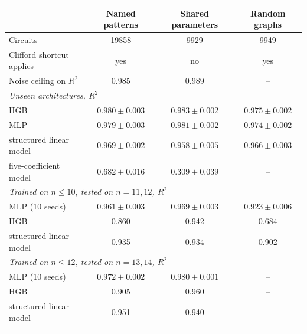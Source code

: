 \begin{tabular}{lccc}
\toprule
 & Named patterns & Shared parameters & Random graphs \\
\midrule
Circuits & 19858 & 9929 & 9949 \\
Clifford shortcut applies & yes & no & yes \\
Noise ceiling on $R^2$ & 0.985 & 0.989 & -- \\
\midrule
\multicolumn{4}{l}{\emph{Unseen architectures, $R^2$}}\\
\quad HGB & $0.980 \pm 0.003$ & $0.983 \pm 0.002$ & $0.975 \pm 0.002$ \\
\quad MLP & $0.979 \pm 0.003$ & $0.981 \pm 0.002$ & $0.974 \pm 0.002$ \\
\quad structured linear model & $0.969 \pm 0.002$ & $0.958 \pm 0.005$ & $0.966 \pm 0.003$ \\
\quad five-coefficient model & $0.682 \pm 0.016$ & $0.309 \pm 0.039$ & -- \\
\midrule
\multicolumn{4}{l}{\emph{Trained on $n\le10$, tested on $n=11,12$, $R^2$}}\\
\quad MLP (10 seeds) & $0.961 \pm 0.003$ & $0.969 \pm 0.003$ & $0.923 \pm 0.006$ \\
\quad HGB & 0.860 & 0.942 & 0.684 \\
\quad structured linear model & 0.935 & 0.934 & 0.902 \\
\midrule
\multicolumn{4}{l}{\emph{Trained on $n\le12$, tested on $n=13,14$, $R^2$}}\\
\quad MLP (10 seeds) & $0.972 \pm 0.002$ & $0.980 \pm 0.001$ & -- \\
\quad HGB & 0.905 & 0.960 & -- \\
\quad structured linear model & 0.951 & 0.940 & -- \\
\botrule
\end{tabular}
